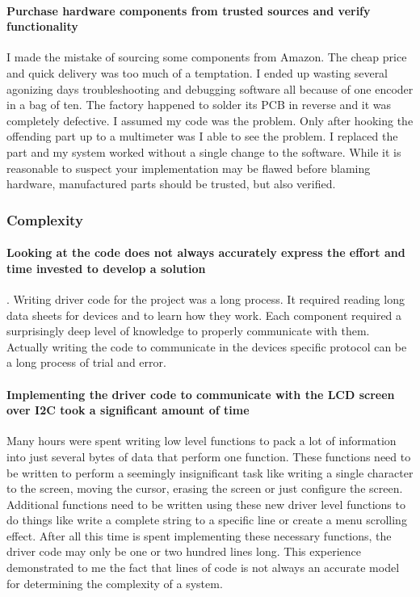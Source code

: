 \documentclass[acmlarge,screen]{acmart}
\begin{document}
	\paragraph{Purchase hardware components from trusted sources and verify functionality} I made the mistake of sourcing some components from Amazon. The cheap price and quick delivery was too much of a temptation. I ended up wasting several agonizing days troubleshooting and debugging software all because of one encoder in a bag of ten. The factory happened to solder its PCB in reverse and it was completely defective. I assumed my code was the problem. Only after hooking the offending part up to a multimeter was I able to see the problem. I replaced the part and my system worked without a single change to the software. While it is reasonable to suspect your implementation may be flawed before blaming hardware, manufactured parts should be trusted, but also verified.
	
	\subsubsection{Complexity}
	\paragraph{Looking at the code does not always accurately express the effort and time invested to develop a solution}. Writing driver code for the project was a long process. It required reading long data sheets for devices and to learn how they work. Each component required a surprisingly deep level of knowledge to properly communicate with them. Actually writing the code to communicate in the devices specific protocol can be a long process of trial and error. 
	
	\paragraph{Implementing the driver code to communicate with the LCD screen over I2C took a significant amount of time} Many hours were spent writing low level functions to pack a lot of information into just several bytes of data that perform one function. These functions need to be written to perform a seemingly insignificant task like writing a single character to the screen, moving the cursor, erasing the screen or just configure the screen. Additional functions need to be written using these new driver level functions to do things like write a complete string to a specific line or create a menu scrolling effect. After all this time is spent implementing these necessary functions, the driver code may only be one or two hundred lines long. This experience demonstrated to me the fact that lines of code is not always an accurate model for determining the complexity of a system.
	
\end{document}
